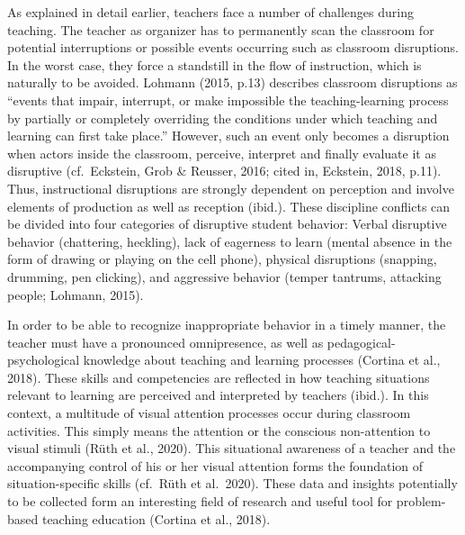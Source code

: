 \documentclass[
  man]{apa6}
\begin{document}
As explained in detail earlier, teachers face a number of challenges during teaching. The teacher as organizer has to permanently scan the classroom for potential interruptions or possible events occurring such as classroom disruptions. In the worst case, they force a standstill in the flow of instruction, which is naturally to be avoided. Lohmann (2015, p.13) describes classroom disruptions as ``events that impair, interrupt, or make impossible the teaching-learning process by partially or completely overriding the conditions under which teaching and learning can first take place.'' However, such an event only becomes a disruption when actors inside the classroom, perceive, interpret and finally evaluate it as disruptive (cf.~Eckstein, Grob \& Reusser, 2016; cited in, Eckstein, 2018, p.11). Thus, instructional disruptions are strongly dependent on perception and involve elements of production as well as reception (ibid.). These discipline conflicts can be divided into four categories of disruptive student behavior: Verbal disruptive behavior (chattering, heckling), lack of eagerness to learn (mental absence in the form of drawing or playing on the cell phone), physical disruptions (snapping, drumming, pen clicking), and aggressive behavior (temper tantrums, attacking people; Lohmann, 2015).

In order to be able to recognize inappropriate behavior in a timely manner, the teacher must have a pronounced omnipresence, as well as pedagogical-psychological knowledge about teaching and learning processes (Cortina et al., 2018). These skills and competencies are reflected in how teaching situations relevant to learning are perceived and interpreted by teachers (ibid.). In this context, a multitude of visual attention processes occur during classroom activities. This simply means the attention or the conscious non-attention to visual stimuli (Rüth et al., 2020). This situational awareness of a teacher and the accompanying control of his or her visual attention forms the foundation of situation-specific skills (cf.~Rüth et al.~2020). These data and insights potentially to be collected form an interesting field of research and useful tool for problem-based teaching education (Cortina et al., 2018).
\end{document}
